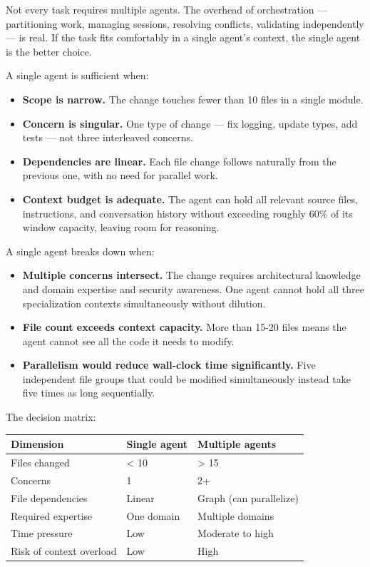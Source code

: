 \documentclass[
  a4paper,
  DIV=11,
  numbers=noendperiod]{scrreprt}
\newcounter{none} %
\providecommand{\tightlist}{%
  \setlength{\itemsep}{0pt}\setlength{\parskip}{0pt}}
\begin{document}
Not every task requires multiple agents. The overhead of orchestration
--- partitioning work, managing sessions, resolving conflicts,
validating independently --- is real. If the task fits comfortably in a
single agent's context, the single agent is the better choice.

A single agent is sufficient when:

\begin{itemize}
\tightlist
\item
  \textbf{Scope is narrow.} The change touches fewer than 10 files in a
  single module.
\item
  \textbf{Concern is singular.} One type of change --- fix logging,
  update types, add tests --- not three interleaved concerns.
\item
  \textbf{Dependencies are linear.} Each file change follows naturally
  from the previous one, with no need for parallel work.
\item
  \textbf{Context budget is adequate.} The agent can hold all relevant
  source files, instructions, and conversation history without exceeding
  roughly 60\% of its window capacity, leaving room for reasoning.
\end{itemize}

A single agent breaks down when:

\begin{itemize}
\tightlist
\item
  \textbf{Multiple concerns intersect.} The change requires
  architectural knowledge and domain expertise and security awareness.
  One agent cannot hold all three specialization contexts simultaneously
  without dilution.
\item
  \textbf{File count exceeds context capacity.} More than 15-20 files
  means the agent cannot see all the code it needs to modify.
\item
  \textbf{Parallelism would reduce wall-clock time significantly.} Five
  independent file groups that could be modified simultaneously instead
  take five times as long sequentially.
\end{itemize}

The decision matrix:

{\def\LTcaptype{none} %
\begin{longtable}[]{@{}lll@{}}
\toprule\noalign{}
Dimension & Single agent & Multiple agents \\
\midrule\noalign{}
\endhead
\bottomrule\noalign{}
\endlastfoot
Files changed & \textless{} 10 & \textgreater{} 15 \\
Concerns & 1 & 2+ \\
File dependencies & Linear & Graph (can parallelize) \\
Required expertise & One domain & Multiple domains \\
Time pressure & Low & Moderate to high \\
Risk of context overload & Low & High \\
\end{longtable}
}
\end{document}
